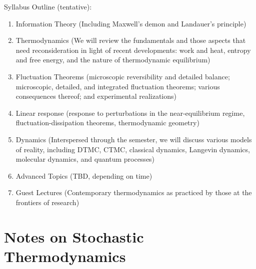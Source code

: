 \documentclass[article,notes]{bespoke6}
\begin{document}
Syllabus Outline (tentative):
\begin{enumerate}
  \item Information Theory (Including Maxwell's demon and Landauer's principle)
  \item Thermodynamics (We will review the fundamentals and those aspects that need reconsideration in light of recent developments: work and heat, entropy and free energy, and the nature of thermodynamic equilibrium) 
  \item Fluctuation Theorems (microscopic reversibility and detailed balance; microscopic, detailed, and integrated fluctuation theorems; various consequences thereof; and experimental realizations)
  \item Linear response (response to perturbations in the near-equilibrium regime, fluctuation-dissipation theorems, thermodynamic geometry)
  \item Dynamics (Interspersed through the semester, we will discuss various models of reality, including DTMC, CTMC, classical dynamics, Langevin dynamics, molecular dynamics, and quantum processes)
  \item Advanced Topics (TBD, depending on time)
  \item Guest Lectures (Contemporary thermodynamics as practiced by those at the frontiers of research)
\end{enumerate}

\newpage



\clearpage





\clearpage
\part*{Notes on Stochastic Thermodynamics}


\appendix


%




\end{document}
